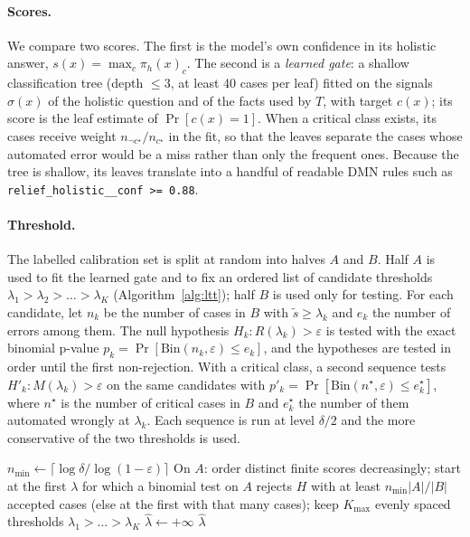 \documentclass[a4paper,fleqn]{cas-sc}
\theoremstyle{definition}
\newcommand{\feel}[1]{\texttt{#1}}
\begin{document}
\paragraph{Scores.} We compare two scores. The first is the model's own confidence in its holistic answer, $s(x)=\max_c\pi_h(x)_c$. The second is a \emph{learned gate}: a shallow classification tree (depth $\le 3$, at least 40 cases per leaf) fitted on the signals $\sigma(x)$ of the holistic question and of the facts used by $T$, with target $c(x)$; its score is the leaf estimate of $\Pr[c(x)=1]$. When a critical class exists, its cases receive weight $n_{\neg c^\star}/n_{c^\star}$ in the fit, so that the leaves separate the cases whose automated error would be a miss rather than only the frequent ones. Because the tree is shallow, its leaves translate into a handful of readable DMN rules such as \feel{relief\_holistic\_\_conf >= 0.88}.

\paragraph{Threshold.} The labelled calibration set is split at random into halves $A$ and $B$. Half $A$ is used to fit the learned gate and to fix an ordered list of candidate thresholds $\lambda_1>\lambda_2>\dots>\lambda_K$ (Algorithm~\ref{alg:ltt}); half $B$ is used only for testing. For each candidate, let $n_k$ be the number of cases in $B$ with $\tilde s\ge\lambda_k$ and $e_k$ the number of errors among them. The null hypothesis $H_k: R(\lambda_k)>\varepsilon$ is tested with the exact binomial p-value $p_k=\Pr[\mathrm{Bin}(n_k,\varepsilon)\le e_k]$, and the hypotheses are tested in order until the first non-rejection. With a critical class, a second sequence tests $H'_k: M(\lambda_k)>\varepsilon$ on the same candidates with $p'_k=\Pr[\mathrm{Bin}(n^\star,\varepsilon)\le e^\star_k]$, where $n^\star$ is the number of critical cases in $B$ and $e^\star_k$ the number of them automated wrongly at $\lambda_k$. Each sequence is run at level $\delta/2$ and the more conservative of the two thresholds is used.

\begin{algorithm}[tbp]
  \caption{Gate threshold by Learn-then-Test with fixed-sequence testing.}
  \label{alg:ltt}
  \small
  $n_{\min}\leftarrow\lceil \log\delta / \log(1-\varepsilon)\rceil$ 
  On $A$: order distinct finite scores decreasingly; start at the first $\lambda$ for which a binomial test on $A$ rejects $H$ with at least $n_{\min}|A|/|B|$ accepted cases (else at the first with that many cases); keep $K_{\max}$ evenly spaced thresholds $\lambda_1>\dots>\lambda_K$\;
  $\hat\lambda\leftarrow+\infty$\;
  \Return $\hat\lambda$\;
\end{algorithm}
\end{document}
